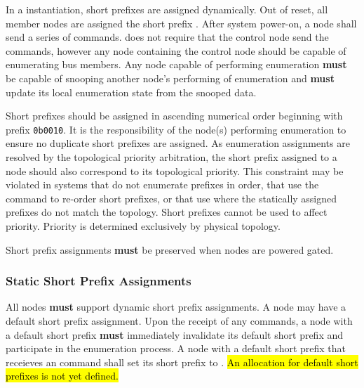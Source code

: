 In a \bus instantiation, short prefixes are assigned dynamically. Out of
reset, all member nodes are assigned the short prefix
. After system power-on, a node
shall send a series of  commands. \bus does not
require that the control node send the  commands,
however any node containing the control node should be capable of enumerating
bus members. Any node capable of performing enumeration {\bf must} be capable
of snooping another node's performing of enumeration and {\bf must} update its
local enumeration state from the snooped data.

Short prefixes should be assigned in ascending numerical order beginning with
prefix {\tt 0b0010}.
It is the responsibility of the
node(s) performing enumeration to ensure no duplicate short prefixes are
assigned.
As enumeration assignments are resolved by the
topological priority arbitration, the short prefix assigned to a node should
also correspond to its topological priority.
This constraint may be violated in systems that do not enumerate prefixes in
order, that use the
 command to re-order short prefixes, or
that use  where the statically
assigned prefixes do not match the topology. Short prefixes cannot be used to
affect priority. Priority is determined exclusively by physical topology.

Short prefix assignments {\bf must} be preserved when nodes are powered gated.

\subsubsection{Static Short Prefix Assignments}
\label{sec:addressing-static-short-prefix}
All \bus nodes {\bf must} support dynamic short prefix assignments. A node may
have a default short prefix assignment. Upon the receipt of any
 commands, a node with a default short prefix {\bf
must} immediately invalidate its default short prefix and participate in the
enumeration process. A node with a default short prefix that receieves an
 command shall set its short prefix to
.
\hl{An allocation for default short prefixes is not yet defined.}

